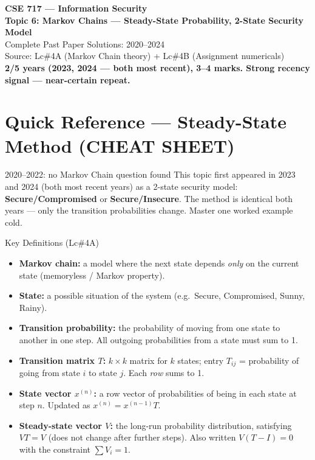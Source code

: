 \documentclass[12pt,a4paper]{article}
\begin{document}
\begin{center}
{\LARGE\bfseries\color{folblue} CSE 717 --- Information Security}\\[4pt]
{\large\bfseries Topic 6: Markov Chains --- Steady-State Probability, 2-State Security Model}\\[2pt]
{\large Complete Past Paper Solutions: 2020--2024}\\[6pt]
{\normalsize Source: Lc\#4A (Markov Chain theory) + Lc\#4B (Assignment numericals)}\\[2pt]
{\normalsize\color{darkred}\textbf{2/5 years (2023, 2024 --- both most recent), 3--4 marks. Strong recency signal --- near-certain repeat.}}
\end{center}

\tableofcontents

\section*{Quick Reference --- Steady-State Method (CHEAT SHEET)}

\begin{warnbox}{2020--2022: no Markov Chain question found}
This topic first appeared in 2023 and 2024 (both most recent years) as a 2-state security model: \textbf{Secure/Compromised} or \textbf{Secure/Insecure}. The method is identical both years --- only the transition probabilities change. Master one worked example cold.
\end{warnbox}

\begin{algobox}{Key Definitions (Lc\#4A)}
\begin{itemize}[noitemsep]
  \item \textbf{Markov chain:} a model where the next state depends \emph{only} on the current state (memoryless / Markov property).
  \item \textbf{State:} a possible situation of the system (e.g.\ Secure, Compromised, Sunny, Rainy).
  \item \textbf{Transition probability:} the probability of moving from one state to another in one step. All outgoing probabilities from a state must sum to 1.
  \item \textbf{Transition matrix $T$:} $k \times k$ matrix for $k$ states; entry $T_{ij}$ = probability of going from state $i$ to state $j$. Each \emph{row} sums to 1.
  \item \textbf{State vector $x^{(n)}$:} a row vector of probabilities of being in each state at step $n$. Updated as $x^{(n)} = x^{(n-1)} T$.
  \item \textbf{Steady-state vector $V$:} the long-run probability distribution, satisfying $VT = V$ (does not change after further steps). Also written $V(T - I) = 0$ with the constraint $\sum V_i = 1$.
\end{itemize}
\end{algobox}
\end{document}
